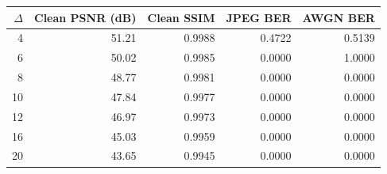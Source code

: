 \begin{tabular}{rrrrr}
\toprule
$\Delta$ & Clean PSNR (dB) & Clean SSIM & JPEG BER & AWGN BER \\
\midrule
4 & 51.21 & 0.9988 & 0.4722 & 0.5139 \\
6 & 50.02 & 0.9985 & 0.0000 & 1.0000 \\
8 & 48.77 & 0.9981 & 0.0000 & 0.0000 \\
10 & 47.84 & 0.9977 & 0.0000 & 0.0000 \\
12 & 46.97 & 0.9973 & 0.0000 & 0.0000 \\
16 & 45.03 & 0.9959 & 0.0000 & 0.0000 \\
20 & 43.65 & 0.9945 & 0.0000 & 0.0000 \\
\bottomrule
\end{tabular}
